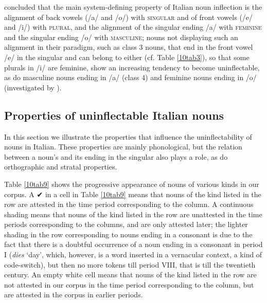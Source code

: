 \documentclass[output=paper,colorlinks,citecolor=brown]{langscibook}
\begin{document}
\citet{dachillethornton2003} concluded that the main system-defining property of Italian noun inflection is the alignment of back vowels (/a/ and /o/) with \textsc{singular} and of front vowels (/e/ and /i/) with \textsc{plural}, and the alignment of the singular ending /a/ with \textsc{feminine} and the singular ending /o/ with \textsc{masculine}; nouns not displaying such an alignment in their paradigm, such as class 3 nouns, that end in the front vowel /e/ in the singular and can belong to either  (cf. Table \ref{10tab3}), so that some plurals in /i/ are feminine, show an increasing tendency to become uninflectable, as do masculine nouns ending in /a/ (class 4) and feminine nouns ending in /o/ (investigated by \citealt{dachillethornton2008}).

\subsection{Properties of uninflectable Italian nouns}

In this section we illustrate the properties that influence the uninflectability of nouns in Italian. These properties are mainly phonological, but the relation between a noun's  and its ending in the singular also plays a role, as do orthographic and stratal properties.

Table \ref{10tab9} shows the progressive appearance of nouns of various kinds in our corpus. A ✔ in a cell in Table \ref{10tab9} means that nouns of the kind listed in the row are attested in the time period corresponding to the column. A continuous shading means that nouns of the kind listed in the row are unattested in the time periods corresponding to the columns, and are only attested later; the lighter shading in the row corresponding to nouns ending in a consonant is due to the fact that there is a doubtful occurrence of a noun ending in a consonant in period I (\emph{dies} `day', which, however, is a  word inserted in a vernacular context, a kind of code-switch), but then no more tokens till period VIII, that is till the twentieth century. An empty white cell means that nouns of the kind listed in the row are not attested in our corpus in the time period corresponding to the column, but are attested in the corpus in earlier periods.
\end{document}
